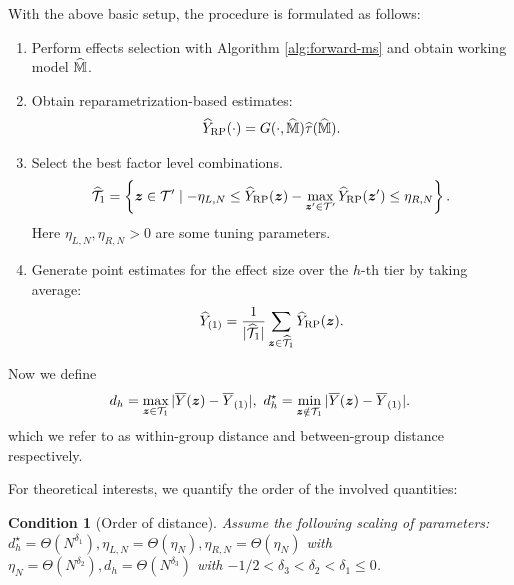 \documentclass[12pt]{article}
\newtheorem{condition}{Condition}
\begin{document}
With the above basic setup, the procedure  is formulated as follows:
\begin{enumerate}
    \item Perform effects selection with Algorithm \ref{alg:forward-ms} and obtain working model $\widehat{{\mathbb{M}}}$.
    \item  Obtain reparametrization-based estimates:
      \begin{align*}
           \widehat{Y}_{\operatorname{RP}}(\cdot) = G(\cdot,{\widehat{{\mathbb{M}}}}) {\widehat{\tau}}(\widehat{{\mathbb{M}}}).
      \end{align*}
    \item  Select the best factor level combinations. 
    \begin{align*}
          \widehat{{\mathcal{T}}}_{1} = \left\{{\boldsymbol{z}}\in{\mathcal{T}}'\mid -\eta_{L,N}\le {\widehat{Y}}_{\operatorname{RP}}({\boldsymbol{z}})-\max_{{\boldsymbol{z}}'\in{\mathcal{T}}' }{\widehat{Y}}_{\operatorname{RP}}({\boldsymbol{z}}') \le \eta_{R,N}\right\}.
      \end{align*}
      Here $\eta_{L,N},\eta_{R,N}>0$ are some tuning parameters.
    \item Generate point estimates for the effect size over the $h$-th tier by taking average:
      \begin{align*}
         {\widehat{Y}}_{(1)} = \frac{1}{|\widehat{{\mathcal{T}}}_{1}|} \sum_{{\boldsymbol{z}}\in \widehat{{\mathcal{T}}}_{1}} {\widehat{Y}}_{\operatorname{RP}}({\boldsymbol{z}}). 
      \end{align*}

\end{enumerate}










Now we define
\begin{align*}
    d_h = \max_{{\boldsymbol{z}}\in{\mathcal{T}}_{1} } |\overline{Y}({\boldsymbol{z}}) - \overline{Y}_{(1)}|, ~d^\star_h = \min_{{\boldsymbol{z}}\notin{\mathcal{T}}_{1}} |\overline{Y}({\boldsymbol{z}}) - \overline{Y}_{(1)}|.
\end{align*}
which we refer to as within-group distance and between-group distance respectively. 

For theoretical interests, we quantify the order of the involved quantities:
\begin{condition}[Order of distance]\label{cond:distance}
Assume the following scaling of parameters: $d_h^\star= \Theta(N^{\delta_1}),  \eta_{L,N} = \Theta(\eta_N),  \eta_{R,N} = \Theta(\eta_N)$ with $\eta_N = \Theta(N^{\delta_2}), d_h = \Theta(N^{\delta_3})$ with $-1/2 < \delta_3 < \delta_2 < \delta_1 \le 0$.

\end{condition}
\end{document}
